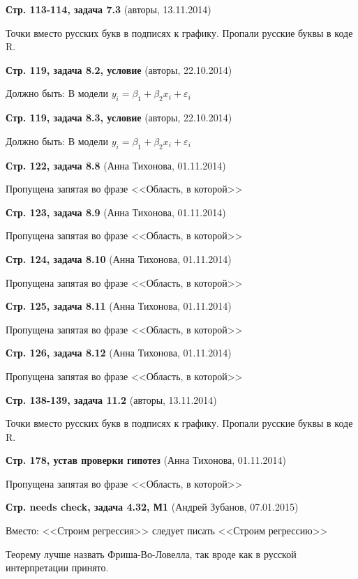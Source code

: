 \documentclass{article}
\newcommand{\erroronpage}[4]{\textbf{Стр. #1, #2} (#3, #4)}
\begin{document}
\erroronpage{113-114}{задача 7.3}{авторы}{13.11.2014}

Точки вместо русских букв в подписях к графику. Пропали русские буквы в коде R.

\erroronpage{119}{задача 8.2, условие}{авторы}{22.10.2014}

Должно быть: В модели $y_i=\beta_1 + \beta_2 x_i +\varepsilon_i$

\erroronpage{119}{задача 8.3, условие}{авторы}{22.10.2014}

Должно быть: В модели $y_i=\beta_1 + \beta_2 x_i +\varepsilon_i$

\erroronpage{122}{задача 8.8}{Анна Тихонова}{01.11.2014}

Пропущена запятая во фразе <<Область, в которой>>

\erroronpage{123}{задача 8.9}{Анна Тихонова}{01.11.2014}

Пропущена запятая во фразе <<Область, в которой>>

\erroronpage{124}{задача 8.10}{Анна Тихонова}{01.11.2014}

Пропущена запятая во фразе <<Область, в которой>>

\erroronpage{125}{задача 8.11}{Анна Тихонова}{01.11.2014}

Пропущена запятая во фразе <<Область, в которой>>

\erroronpage{126}{задача 8.12}{Анна Тихонова}{01.11.2014}

Пропущена запятая во фразе <<Область, в которой>>

\erroronpage{138-139}{задача 11.2}{авторы}{13.11.2014}

Точки вместо русских букв в подписях к графику. Пропали русские буквы в коде R.

\erroronpage{178}{устав проверки гипотез}{Анна Тихонова}{01.11.2014}

Пропущена запятая во фразе <<Область, в которой>>

\erroronpage{needs check}{задача 4.32, М1}{Андрей Зубанов}{07.01.2015}

Вместо: <<Строим регрессия>> следует писать <<Строим регрессию>> 

Теорему лучше назвать Фриша-Во-Ловелла, так вроде как в русской интерпретации принято.
\end{document}
